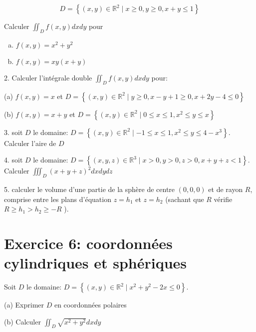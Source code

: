 $$
D=\left\{(x, y) \in \mathbb{R}^2 \mid x \geq 0, y \geq 0, x+y \leq 1\right\}
$$


Calculer $\iint_D f(x, y) d x d y$ pour
\begin{enumerate}[a)]
    \item  $f(x, y)=x^2+y^2$
    \item $f(x, y)=x y(x+y)$
\end{enumerate}


2. Calculer l'intégrale double $\iint_D f(x, y) d x d y$ pour:

(a) $f(x, y)=x$ et $D=\left\{(x, y) \in \mathbb{R}^2 \mid y \geq 0, x-y+1 \geq 0, x+2 y-4 \leq 0\right\}$

(b) $f(x, y)=x+y$ et $D=\left\{(x, y) \in \mathbb{R}^2 \mid 0 \leq x \leq 1, x^2 \leq y \leq x\right\}$

3. soit $D$ le domaine: $D=\left\{(x, y) \in \mathbb{R}^2 \mid-1 \leq x \leq 1, x^2 \leq y \leq 4-x^3\right\}$. Calculer l'aire de $D$

4. soit $D$ le domaine: $D=\left\{(x, y, z) \in \mathbb{R}^3 \mid x>0, y>0, z>0, x+y+z<1\right\}$. Calculer $\iiint_D(x+y+z)^2 d x d y d z$

5. calculer le volume d'une partie de la sphère de centre $(0,0,0)$ et de rayon $R$, comprise entre les plans d'équation $z=h_1$ et $z=h_2$ (sachant que $R$ vérifie $R \geq h_1>h_2 \geq-R$ ).

\section*{Exercice 6: coordonnées cylindriques et sphériques}


Soit $D$ le domaine: $D=\left\{(x, y) \in \mathbb{R}^2 \mid x^2+y^2-2 x \leq 0\right\}$.

(a) Exprimer $D$ en coordonnées polaires

(b) Calculer $\iint_D \sqrt{x^2+y^2} d x d y$
